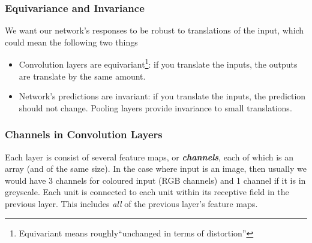\documentclass[11pt]{article}
\begin{document}
\subsubsection{Equivariance and Invariance}
We want our network's responses to be robust to translations of the input, which could mean the following two things
\begin{itemize}
    \item Convolution layers are equivariant\footnote{Equivariant means roughly``unchanged in terms of distortion''}: if you translate the inputs, the outputs are translate by the same amount. 
    \item Network's predictions are invariant: if you translate the inputs, the prediction should not change. Pooling layers provide invariance to small translations. 
\end{itemize}

\subsubsection{Channels in Convolution Layers}
Each layer is consist of several feature maps, or \textit{\textbf{channels}}, each of which is an array (and of the same size). In the case where input is an image, then usually we would have 3 channels for coloured input (RGB channels) and 1 channel if it is in greyscale. Each unit is connected to each unit within its receptive field in the previous layer. This includes \textit{all} of the previous layer's feature maps. 
\end{document}
